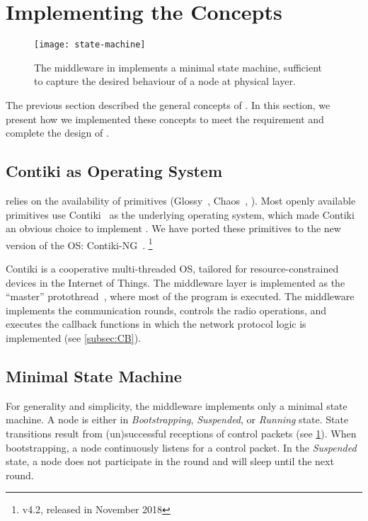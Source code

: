 \section{Implementing the Concepts}
\label{sec:baloo_implementation}

\begin{figure}
	\centering
	\texttt{[image: state-machine]}
	\caption{The middleware in \baloo implements a minimal state machine, sufficient to capture the desired behaviour of a node at physical layer.
		}
	\label{fig:state-machine}
\end{figure}

The previous section described the general concepts of \baloo.
In this section, we present how we implemented these concepts to meet the  requirement and complete the design of \baloo.

\subsection{Contiki as Operating System}
\label{subsec:contiki}


\baloo relies on the availability of \ST primitives (\eg Glossy~\cite{ferrari2011Glossy}, Chaos~\cite{landsiedel2013Chaos}, \etc). Most openly available primitives use Contiki~\cite{dunkels2004Contiki} as the underlying operating system, which made Contiki an obvious choice to implement \baloo.
We have ported these primitives to the new version of the OS: Contiki-NG~\cite{ContikiNG}.%
\footnote{v4.2, released in November 2018}

Contiki is a cooperative multi-threaded OS, tailored for resource-constrained devices in the Internet of Things.
The middleware layer is implemented as the ``master'' protothread~\cite{dunkels2006Protothreads}, where most of the program is executed. The middleware implements the communication rounds, controls the radio operations, and executes the callback functions in which the network protocol logic is implemented (see \cref{subsec:CB}).


\subsection{Minimal State Machine}
\label{subsec:state-machine}
For generality and simplicity, the middleware implements only a minimal state machine. A node is either in \textsl{Bootstrapping}, \textsl{Suspended}, or \textsl{Running} state.
State transitions result from (un)successful receptions of control packets (see \cref{fig:state-machine}).
When bootstrapping, a node continuously listens for a control packet. In the \textsl{Suspended} state, a node does not participate in the round and will sleep until the next round.

